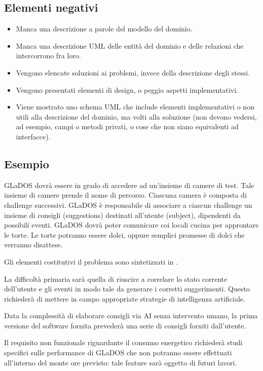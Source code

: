 \documentclass[a4paper,12pt]{report}
\begin{document}
\subsection*{Elementi negativi}
\begin{itemize}
	\item Manca una descrizione a parole del modello del dominio.
	\item Manca una descrizione UML delle entità del dominio e delle relazioni che intercorrono fra loro.
	\item Vengono elencate soluzioni ai problemi, invece della descrizione degli stessi.
	\item Vengono presentati elementi di design, o peggio aspetti implementativi.
	\item Viene mostrato uno schema UML che include elementi implementativi o non utili alla descrizione del dominio, ma volti alla soluzione (non devono vedersi, ad esempio, campi o metodi privati, o cose che non siano equivalenti ad interfacce).
\end{itemize}

\subsection*{Esempio}
GLaDOS dovrà essere in grado di accedere ad un'insieme di camere di test.
%
Tale insieme di camere prende il nome di percorso.
%
Ciascuna camera è composta di challenge successivi.
%
GLaDOS è responsabile di associare a ciascun challenge un insieme di consigli (suggestions) destinati all'utente (subject), dipendenti da possibili eventi.
%
GLaDOS dovrà poter comunicare coi locali cucina per approntare le torte.
%
Le torte potranno essere dolci, oppure semplici promesse di dolci che verranno disattese.

Gli elementi costitutivi il problema sono sintetizzati in .

La difficoltà primaria sarà quella di riuscire a correlare lo stato corrente dell'utente e gli eventi in modo tale da generare i corretti suggerimenti.
%
Questo richiederà di mettere in campo appropriate strategie di intelligenza artificiale.

Data la complessità di elaborare consigli via AI senza intervento umano, la prima versione del software fornita prevederà una serie di consigli forniti dall'utente.

Il requisito non funzionale riguardante il consumo energetico richiederà studi specifici sulle performance di GLaDOS che non potranno essere effettuati all'interno del monte ore previsto: tale feature sarà oggetto di futuri lavori.
\end{document}
